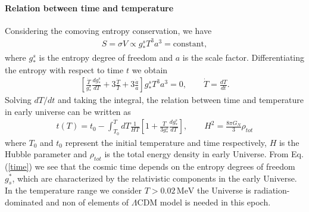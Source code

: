 {%
\paragraph{Relation between time and temperature}
Considering the comoving entropy conservation, we have
\begin{align}
S=\sigma V\propto g^s_\ast T^3a^3=\mathrm{constant},
\end{align}
where $g^s_\ast$ is the entropy degree of freedom and $a$ is the scale factor. Differentiating the entropy with respect to time $t$ we obtain
\begin{align}
\left[\frac{\dot{T}}{g^s_\ast}\frac{dg^s_\ast}{dT}+3\frac{\dot{T}}{T}+3\frac{\dot{a}}{a}\right]g^s_\ast T^3a^3=0,\qquad \dot{T}=\frac{dT}{dt}.
\end{align}
Solving $dT/dt$ and taking the integral, the relation between time and temperature in early universe can be written as
\begin{align}\label{time}
t(T)=t_0-\int^T_{T_0}dT\frac{1}{HT}\left[1+\frac{T}{3g^s_\ast}\frac{dg^s_\ast}{dT}\right],\qquad H^2=\frac{8\pi G_N}{3}\rho_{tot}
\end{align}
where $T_0$ and $t_0$ represent the initial temperature and time respectively, $H$ is the Hubble parameter and $\rho_{tot}$ is the total energy density in early Universe. From Eq. (\ref{time}) we see that the cosmic time depends on the entropy degrees of freedom $g^\ast_s$, which are characterized by the relativistic components in the early Universe. In the temperature range we consider  $T>0.02\,\mathrm{MeV}$ the Universe is radiation-dominated and non of elements of $\Lambda$CDM model is needed in this epoch.   
 


}

